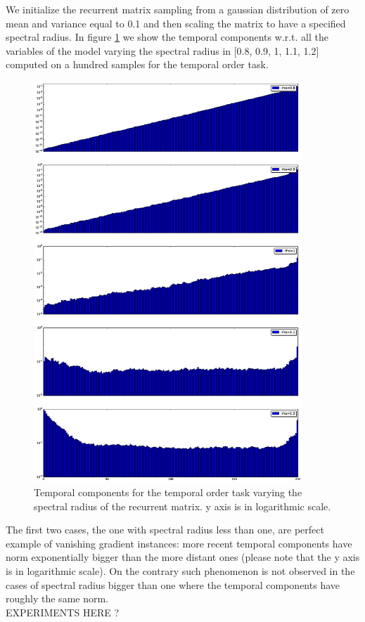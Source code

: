 We initialize the recurrent matrix sampling from a gaussian distribution of zero mean and variance equal to 0.1 and then scaling the matrix to have a specified spectral radius. In figure \ref{fig:temporal_norms} we show the temporal components w.r.t. all the variables of the model varying the spectral radius in [0.8, 0.9, 1, 1.1, 1.2] computed on a hundred samples for the temporal order task.

\begin{figure}
    \includegraphics[width=0.9\textwidth]{chapter3/temporal_components.eps}
    \caption{Temporal components for the temporal order task varying the spectral radius of the recurrent matrix. y axis is in logarithmic scale.}
    \label{fig:temporal_norms}
\end{figure}

The first two cases, the one with spectral radius less than one, are perfect example of vanishing gradient instances: more recent temporal components have norm exponentially bigger than the more distant ones (please note that the y axis is in logarithmic scale). On the contrary such phenomenon is not observed in the cases of spectral radius bigger than one where the temporal components have roughly the same norm.
\\
EXPERIMENTS HERE ?

